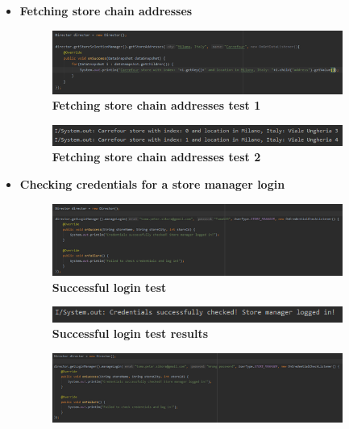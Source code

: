 \begin{itemize}
\item \textbf{Fetching store chain addresses}
\begin{figure}[H]
\centering
\includegraphics[width=0.9\textwidth]{Images/TestingPics/StoreChainAddresses1}
\caption{\label{fig:test5}\textbf{Fetching store chain addresses test 1}}
\end{figure}
\begin{figure}[H]
\centering
\includegraphics[width=0.9\textwidth]{Images/TestingPics/StoreChainAddresses2}
\caption{\label{fig:test6}\textbf{Fetching store chain addresses test 2}}
\end{figure}
\item \textbf{Checking credentials for a store manager login}
\begin{figure}[H]
\centering
\includegraphics[width=0.9\textwidth]{Images/TestingPics/LoginOK1}
\caption{\label{fig:test7}\textbf{Successful login test}}
\end{figure}
\begin{figure}[H]
\centering
\includegraphics[width=0.9\textwidth]{Images/TestingPics/LoginOK2}
\caption{\label{fig:test8}\textbf{Successful login test results}}
\end{figure}
\begin{figure}[H]
\centering
\includegraphics[width=0.9\textwidth]{Images/TestingPics/LoginBad1}

\end{figure}
\end{itemize}
